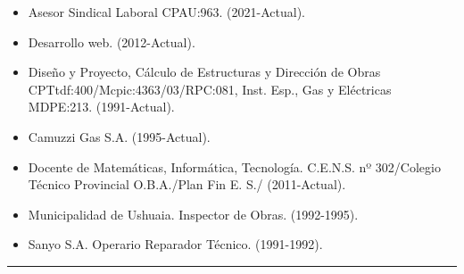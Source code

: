 \documentclass[a4paper,oneside,11pt]{article}
\begin{document}
\begin{multicols}{2} 
\begin{itemize}
    \item Asesor Sindical Laboral CPAU:963. (2021-Actual).
    \item Desarrollo web. (2012-Actual).
    \item Diseño y Proyecto, Cálculo de Estructuras y Dirección de Obras CPTtdf:400/Mcpic:4363/03/RPC:081, Inst. Esp., Gas y Eléctricas MDPE:213. (1991-Actual).
    \item Camuzzi Gas S.A. (1995-Actual).
    \item Docente de Matemáticas, Informática, Tecnología. C.E.N.S. nº 302/Colegio Técnico Provincial O.B.A./Plan Fin E. S./ (2011-Actual).
    \item Municipalidad de Ushuaia. Inspector de Obras. (1992-1995).
    \item Sanyo S.A. Operario Reparador Técnico. (1991-1992).
\end{itemize}
\end{multicols}
\hrule
\end{document}
